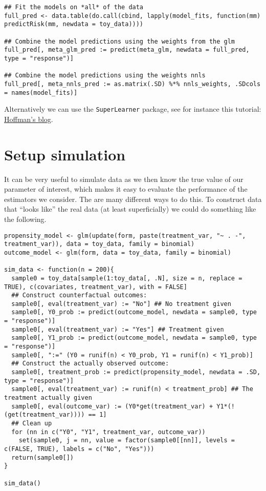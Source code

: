 \documentclass[a4paper,danish]{article}
\begin{document}
\lstset{language=r,label= ,caption= ,captionpos=b,numbers=none}
\begin{lstlisting}
## Fit the models on *all* of the data
full_pred <- data.table(do.call(cbind, lapply(model_fits, function(mm) predictRisk(mm, newdata = toy_data))))

## Combine the model predictions using the weights from the glm
full_pred[, meta_glm_pred := predict(meta_glm, newdata = full_pred, type = "response")]

## Combine the model predictions using the weights nnls
full_pred[, meta_nnls_pred := as.matrix(.SD) %*% nnls_weights, .SDcols = names(model_fits)]
\end{lstlisting}

Alternatively we can use the \texttt{SuperLearner} package, see for instance this tutorial: \href{https://www.khstats.com/blog/sl/superlearning/}{Hoffman's blog}.

\section{Setup simulation}
\label{sec:org101b076}
It can be very useful to simulate data as we then know the true value of our parameter of interest,
which makes it easy to evaluate the performance of the estimators we consider. The are many
different ways to do this. To construct data that ``looks like'' the real data (at least
superficially) we could do something like the following.

\lstset{language=r,label= ,caption= ,captionpos=b,numbers=none}
\begin{lstlisting}
propensity_model <- glm(update(form, paste(treatment_var, "~ . -", treatment_var)), data = toy_data, family = binomial)
outcome_model <- glm(form, data = toy_data, family = binomial)

sim_data <- function(n = 200){
  sample0 = toy_data[sample(1:toy_data[, .N], size = n, replace = TRUE), c(covariates, treatment_var), with = FALSE]
  ## Construct counterfactual outcomes:
  sample0[, eval(treatment_var) := "No"] ## No treatment given
  sample0[, Y0_prob := predict(outcome_model, newdata = sample0, type = "response")]
  sample0[, eval(treatment_var) := "Yes"] ## Treatment given
  sample0[, Y1_prob := predict(outcome_model, newdata = sample0, type = "response")]
  sample0[, ":=" (Y0 = runif(n) < Y0_prob, Y1 = runif(n) < Y1_prob)]
  ## Construct the actually observed outcome:
  sample0[, treatment_prob := predict(propensity_model, newdata = .SD, type = "response")]
  sample0[, eval(treatment_var) := runif(n) < treatment_prob] ## The treatment actually given
  sample0[, eval(outcome_var) := (Y0*get(treatment_var) + Y1*(!(get(treatment_var)))) == 1]
  ## Clean up
  for (nn in c("Y0", "Y1", treatment_var, outcome_var))
    set(sample0, j = nn, value = factor(sample0[[nn]], levels = c(FALSE, TRUE), labels = c("No", "Yes")))
  return(sample0[])
}

sim_data()
\end{lstlisting}
\end{document}
